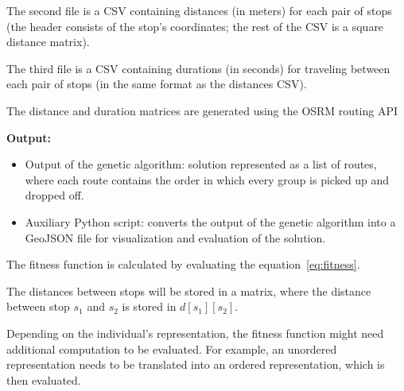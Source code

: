 The second file is a CSV containing distances (in meters) for each pair of stops (the header consists of the stop's coordinates; the rest of the CSV is a square distance matrix).

The third file is a CSV containing durations (in seconds) for traveling between each pair of stops (in the same format as the distances CSV).

The distance and duration matrices are generated using the OSRM routing API \cite{luxen-vetter-2011}

\textbf{Output:}

\begin{itemize}
    \item Output of the genetic algorithm: solution represented as a list of routes, where each route contains the order in which every group is picked up and dropped off.
    \item Auxiliary Python script: converts the output of the genetic algorithm into a GeoJSON file for visualization and evaluation of the solution.
\end{itemize}


The fitness function is calculated by evaluating the equation~\eqref{eq:fitness}.

The distances between stops will be stored in a matrix, where the distance between stop $s_1$ and $s_2$ is stored in $d[s_1][s_2]$.

Depending on the individual's representation, the fitness function might need additional computation to be evaluated. For example, an unordered representation needs to be translated into an ordered representation, which is then evaluated.
